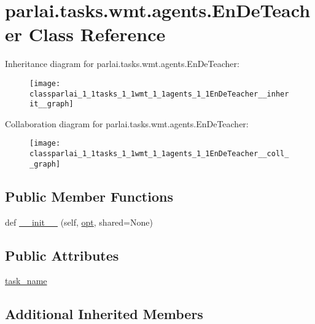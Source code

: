 \hypertarget{classparlai_1_1tasks_1_1wmt_1_1agents_1_1EnDeTeacher}{}\section{parlai.\+tasks.\+wmt.\+agents.\+En\+De\+Teacher Class Reference}
\label{classparlai_1_1tasks_1_1wmt_1_1agents_1_1EnDeTeacher}


Inheritance diagram for parlai.\+tasks.\+wmt.\+agents.\+En\+De\+Teacher\+:
\nopagebreak
\begin{figure}[H]
\begin{center}
\leavevmode
\texttt{[image: classparlai\_1\_1tasks\_1\_1wmt\_1\_1agents\_1\_1EnDeTeacher\_\_inherit\_\_graph]}
\end{center}
\end{figure}


Collaboration diagram for parlai.\+tasks.\+wmt.\+agents.\+En\+De\+Teacher\+:
\nopagebreak
\begin{figure}[H]
\begin{center}
\leavevmode
\texttt{[image: classparlai\_1\_1tasks\_1\_1wmt\_1\_1agents\_1\_1EnDeTeacher\_\_coll\_\_graph]}
\end{center}
\end{figure}
\subsection*{Public Member Functions}
\begin{DoxyCompactItemize}
\item 
def \hyperlink{classparlai_1_1tasks_1_1wmt_1_1agents_1_1EnDeTeacher_ac069783e0b57da33c6d1b1ff8d9791bc}{\+\_\+\+\_\+init\+\_\+\+\_\+} (self, \hyperlink{classparlai_1_1core_1_1teachers_1_1FbDialogTeacher_af7a9ec497b9cd0292d7b8fa220da7c28}{opt}, shared=None)
\end{DoxyCompactItemize}
\subsection*{Public Attributes}
\begin{DoxyCompactItemize}
\item 
\hyperlink{classparlai_1_1tasks_1_1wmt_1_1agents_1_1EnDeTeacher_a694d05cdfc00638200d219f8bfc9b595}{task\+\_\+name}
\end{DoxyCompactItemize}
\subsection*{Additional Inherited Members}


